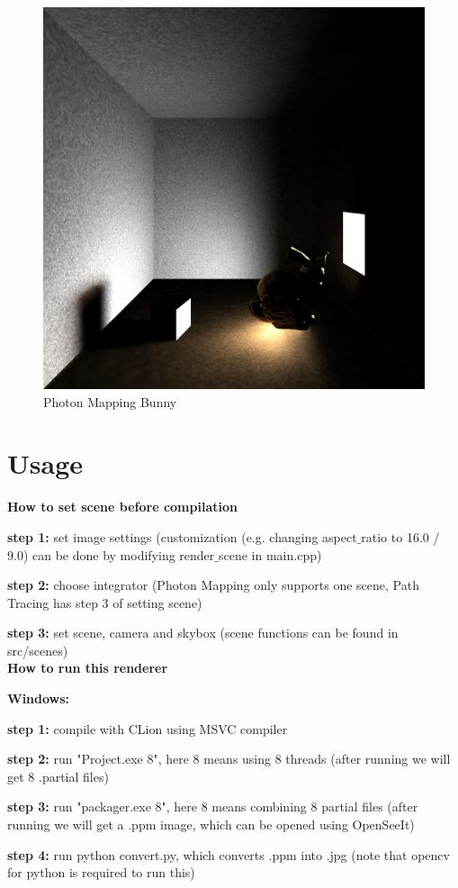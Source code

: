 \documentclass[utf8]{article}
\begin{document}
\begin{figure}[H]
	\centering
	\includegraphics[width=0.5\linewidth]{../_results/photon_mapping_bunny}
	\caption{Photon Mapping Bunny}
	\label{fig:photonmappingbunny}
\end{figure}

\newpage
\section{Usage}

\large \textbf{How to set scene before compilation}

\normalsize
\noindent
\textbf{step 1:} set image settings (customization (e.g. changing aspect$\_$ratio to 16.0 / 9.0) can be done by modifying render$\_$scene in main.cpp)

\noindent
\textbf{step 2:} choose integrator (Photon Mapping only supports one scene, Path Tracing has step 3 of setting scene)

\noindent
\textbf{step 3:} set scene, camera and skybox (scene functions can be found in src/scenes) \\

\noindent
\large \textbf{How to run this renderer}

\normalsize
\noindent
\textbf{Windows:}

\noindent
\textbf{step 1:} compile with CLion using MSVC compiler

\noindent
\textbf{step 2:} run "Project.exe 8", here 8 means using 8 threads (after running we will get 8 .partial files)

\noindent
\textbf{step 3:} run "packager.exe 8", here 8 means combining 8 partial files (after running we will get a .ppm image, which can be opened using OpenSeeIt)

\noindent
\textbf{step 4:} run python convert.py, which converts .ppm into .jpg (note that opencv for python is required to run this)
\end{document}
